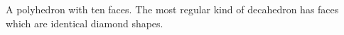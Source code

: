 A polyhedron with ten faces. The most regular kind of decahedron has
faces which are identical diamond shapes.